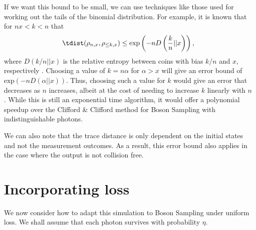 If we want this bound to be small, we can use techniques like those used for working out the tails of the binomial distribution. 
For example, it is known that for $nx<k<n$ that
\begin{equation}
\tdist(\rho_{n,x},\rho_{\leq k,x}) \leq \textrm{exp}\left(-nD\left(\frac{k}{n}||x\right)\right),\label{eqn:worst-case}
\end{equation}
where $D(k/n||x)$ is the relative entropy between coins with bias $k/n$ and $x$, respectively \cite{arratia1989}. 
Choosing a value of $k=n\alpha$ for $\alpha>x$ will give an error bound of $\textrm{exp}(-nD(\alpha||x))$. 
Thus, choosing such a value for $k$ would give an error that decreases as $n$ increases, albeit at the cost of needing to increase $k$ linearly with $n$. 
While this is still an exponential time algorithm, it would offer a polynomial speedup over the Clifford \& Clifford method for Boson Sampling with indistinguishable photons.

We can also note that the trace distance is only dependent on the initial states and not the measurement outcomes. 
As a result, this error bound also applies in the case where the output is not collision free.





\section{Incorporating loss}
\label{sec:loss}

We now consider how to adapt this simulation to Boson Sampling under uniform loss. We shall assume that each photon survives with probability $\eta$.

